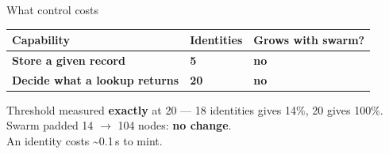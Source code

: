 \documentclass[aspectratio=169]{beamer}
\begin{document}
\begin{frame}{What control costs}
\centering
\vspace{4mm}
\renewcommand{\arraystretch}{1.9}
{\small
\begin{tabular}{@{} >{\bfseries}p{5.2cm}
                    >{\centering\arraybackslash}p{3.0cm}
                    >{\centering\arraybackslash}p{3.6cm} @{}}
    \toprule
    Capability & Identities & Grows with swarm? \\
    \midrule
    Store a given record
        & \textcolor{ctl}{\Large\bfseries 5}
        & \textcolor{okgreen}{\bfseries no} \\
    Decide what a lookup returns
        & \textcolor{ctl}{\Large\bfseries 20}
        & \textcolor{okgreen}{\bfseries no} \\
    \bottomrule
\end{tabular}}

\vspace{7mm}
{\small
Threshold measured \textbf{exactly} at 20 --- 18 identities gives 14\%, 20 gives 100\%.\\[2mm]
Swarm padded 14 $\rightarrow$ 104 nodes: \textbf{no change}.\\[2mm]
\textcolor{ChalmersGrey}{An identity costs \textasciitilde0.1\,s to mint.}}
\end{frame}
\end{document}
